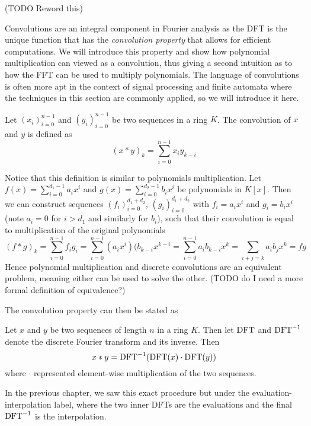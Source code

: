 (TODO Reword this)

Convolutions are an integral component in Fourier analysis as the DFT is the unique function that has the \emph{convolution property} that allows for efficient computations. We will introduce this property and show how polynomial multiplication can viewed as a convolution, thus giving a second intuition as to how the FFT can be used to multiply polynomials. The language of convolutions is often more apt in the context of signal processing and finite automata where the techniques in this section are commonly applied, so we will introduce it here.

\begin{definition}
    Let $(x_i)_{i=0}^{n-1}$ and $(y_i)_{i=0}^{n-1}$ be two sequences in a ring $K$. The convolution of $x$ and $y$ is defined as
    \[
        (x \ast y)_k = \sum^{n-1}_{i=0} x_i y_{k-i}
    \]
\end{definition}

Notice that this definition is similar to polynomials multiplication. Let $f(x) = \sum^{d_1 - 1}_{i=0} a_ix^i$ and $g(x) = \sum^{d_2 - 1}_{i=0} b_ix^i$ be polynomials in $K[x]$. Then we can construct sequences $(f_i)_{i=0}^{d_1 + d_2}$, $(g_i)_{i=0}^{d_1 + d_2}$ with $f_i = a_ix^i$ and $g_i = b_ix^i$ (note $a_i = 0$ for $i > d_1$ and similarly for $b_i$), such that their convolution is equal to multiplication of the original polynomials
\[
    (f \ast g)_k = \sum^{n-1}_{i=0} f_i g_i = \sum^{n-1}_{i=0} (a_ix^i)(b_{k-i}x^{k-i} = \sum^{n-1}_{i=0} a_i b_{k-i} x^k = \sum_{i + j = k} a_ib_j x^k = fg
\]
Hence polynomial multiplication and discrete convolutions are an equivalent problem, meaning either can be used to solve the other. (TODO do I need a more formal definition of equivalence?)

The convolution property can then be stated as

\begin{definition}
    Let $x$ and $y$ be two sequences of length $n$ in a ring $K$. Then let $\textrm{DFT}$ and $\textrm{DFT}^{-1}$ denote the discrete Fourier transform and its inverse. Then
    \[
        x \ast y = \textrm{DFT}^{-1}(\textrm{DFT}(x) \cdot \textrm{DFT}(y))
    \]
    where $\cdot$ represented element-wise multiplication of the two sequences.
\end{definition}

In the previous chapter, we saw this exact procedure but under the evaluation-interpolation label, where the two inner DFTs are the evaluations and the final $\textrm{DFT}^{-1}$ is the interpolation.

